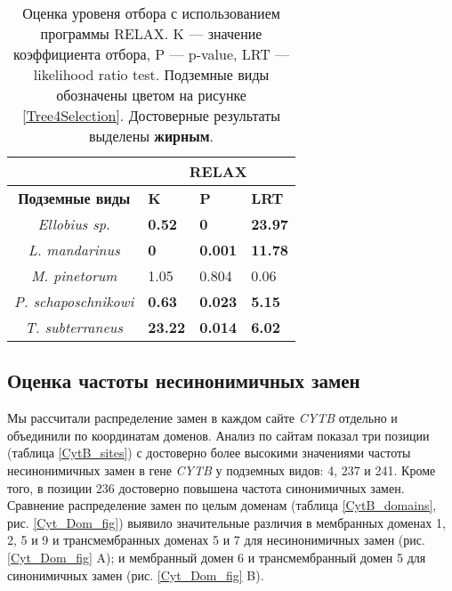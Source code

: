 \begin{table}[h!]
	\caption{Оценка уровеня отбора с использованием программы RELAX. K --- значение коэффициента отбора, P --- p-value, LRT --- likelihood ratio test. Подземные виды обозначены цветом на рисунке \ref{Tree4Selection}. Достоверные результаты выделены \textbf{жирным}.}\label{Relax_cyt}
	\vspace{5mm}
	
\begin{center}
	\begin{tabular}{|c|l|l|l|}
		\hline
		\textbf{}                     & \multicolumn{3}{c|}{\textbf{RELAX}}              \\ \hline
		\textbf{Подземные виды} & \textbf{K}     & \textbf{P}     & \textbf{LRT}   \\ \hline
		\textit{Ellobius sp.}         & \textbf{0.52}  & \textbf{0}     & \textbf{23.97} \\ \hline
		\textit{L. mandarinus}        & \textbf{0}     & \textbf{0.001} & \textbf{11.78} \\ \hline
		\textit{M. pinetorum}         & 1.05           & 0.804          & 0.06           \\ \hline
		\textit{P. schaposchnikowi}   & \textbf{0.63}  & \textbf{0.023} & \textbf{5.15}  \\ \hline
		\textit{T. subterraneus}      & \textbf{23.22} & \textbf{0.014} & \textbf{6.02}  \\ \hline
	\end{tabular}
\end{center}
\end{table}

\subsection{Оценка частоты несинонимичных замен}

Мы рассчитали распределение замен в каждом сайте \textit{CYTB} отдельно и объединили по координатам доменов. Анализ по сайтам показал три позиции (таблица \ref{CytB_sites}) с достоверно более высокими значениями частоты несинонимичных замен в гене \textit{CYTB} у подземных видов: 4, 237 и 241. Кроме того, в позиции 236 достоверно повышена частота синонимичных замен. Сравнение распределение замен по целым доменам (таблица \ref{CytB_domains}, рис. \ref{Cyt_Dom_fig}) выявило значительные различия в мембранных доменах 1, 2, 5 и 9 и трансмембранных доменах 5 и 7 для несинонимичных замен (рис. \ref{Cyt_Dom_fig} A); и мембранный домен 6 и трансмембранный домен 5 для синонимичных замен (рис. \ref{Cyt_Dom_fig} B). 

